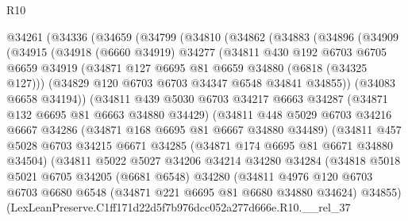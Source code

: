 \begin{lexlean}{R10}
\begin{coremodule}
  @34261
    (@34336
      (@34659
        (@34799
          (@34810
            (@34862
              (@34883
                (@34896
                  (@34909
                    (@34915
                      (@34918
                        (@6660 @34919)
                        @34277
                        (@34811
                          @430
                          @192
                          @6703
                          @6705
                          @6659
                          @34919
                          (@34871 @127 @6695 @81 @6659 @34880 (@6818 (@34325 @127)))
                          (@34829 @120 @6703 @6703 @34347 @6548 @34841 @34855))
                        (@34083 @6658 @34194))
                      (@34811
                        @439
                        @5030
                        @6703
                        @34217
                        @6663
                        @34287
                        (@34871 @132 @6695 @81 @6663 @34880 @34429)
                        (@34811
                          @448
                          @5029
                          @6703
                          @34216
                          @6667
                          @34286
                          (@34871 @168 @6695 @81 @6667 @34880 @34489)
                          (@34811
                            @457
                            @5028
                            @6703
                            @34215
                            @6671
                            @34285
                            (@34871 @174 @6695 @81 @6671 @34880 @34504)
                            (@34811
                              @5022
                              @5027
                              @34206
                              @34214
                              @34280
                              @34284
                              (@34818
                                @5018
                                @5021
                                @6705
                                @34205
                                (@6681 @6548)
                                @34280
                                (@34811
                                  @4976
                                  @120
                                  @6703
                                  @6703
                                  @6680
                                  @6548
                                  (@34871 @221 @6695 @81 @6680 @34880 @34624)
                                  @34855)
                                (LexLeanPreserve.C1ff171d22d5f7b976dcc052a277d666e.R10.__rel_37

\end{coremodule}
\end{lexlean}
